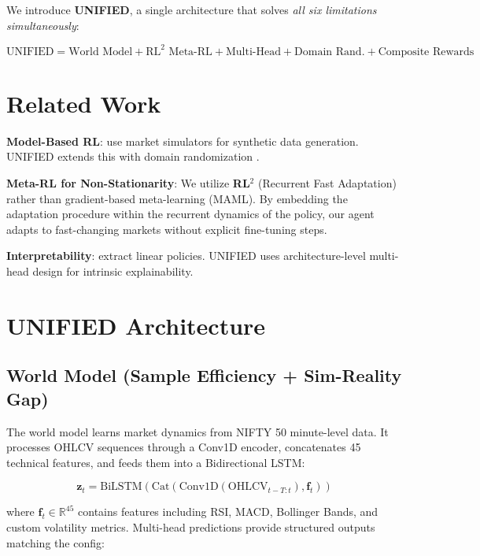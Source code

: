 \documentclass[11pt]{article}
\begin{document}
We introduce \textbf{UNIFIED}, a single architecture that solves \emph{all six limitations simultaneously}:

\begin{equation}
    \text{UNIFIED} = \text{World Model} + \text{RL}^2 \text{ Meta-RL} + \text{Multi-Head} + \text{Domain Rand.} + \text{Composite Rewards}
\end{equation}

\section{Related Work}

\textbf{Model-Based RL}: \citet{wei2019} use market simulators for synthetic data generation. UNIFIED extends this with domain randomization \citep{dr4drl2024}.

\textbf{Meta-RL for Non-Stationarity}: We utilize \textbf{RL$^2$} (Recurrent Fast Adaptation) rather than gradient-based meta-learning (MAML). By embedding the adaptation procedure within the recurrent dynamics of the policy, our agent adapts to fast-changing markets without explicit fine-tuning steps.

\textbf{Interpretability}: \citet{li2025silver} extract linear policies. UNIFIED uses architecture-level multi-head design for intrinsic explainability.

\section{UNIFIED Architecture}

\subsection{World Model (Sample Efficiency + Sim-Reality Gap)}

The world model learns market dynamics from NIFTY 50 minute-level data. It processes OHLCV sequences through a Conv1D encoder, concatenates 45 technical features, and feeds them into a Bidirectional LSTM:

\begin{equation}
    \mathbf{z}_t = \text{BiLSTM}(\text{Cat}(\text{Conv1D}(\text{OHLCV}_{t-T:t}), \mathbf{f}_t))
\end{equation}

where $\mathbf{f}_t \in \mathbb{R}^{45}$ contains features including RSI, MACD, Bollinger Bands, and custom volatility metrics. Multi-head predictions provide structured outputs matching the config:
\end{document}
